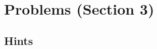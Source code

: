 %

\pagestyle{fancy}  
\fancyhead[L]{\textsc{\rightmark}}
\fancyhead[C]{}  
\fancyhead[R]{\thepage}  
\fancyfoot{}
\renewcommand{\headrulewidth}{0.1pt}
\renewcommand{\contentsname}{Contents}


\tableofcontents
\vspace{10em}
\hrulefill\\


\setcounter{section}{2}
\section{Problems (Section 3)}

\subsection{Hints}




